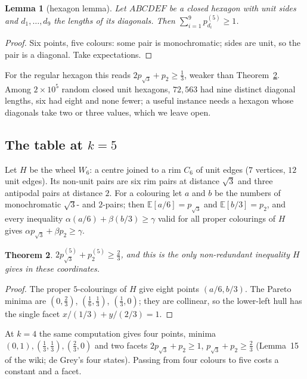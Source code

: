 \documentclass[11pt,a4paper]{amsart}
\newtheorem{theorem}{Theorem}[section]
\newtheorem{lemma}[theorem]{Lemma}
\theoremstyle{remark}
\begin{document}
\begin{lemma}[hexagon lemma]\label{lem:hexagon}
Let $ABCDEF$ be a closed hexagon with unit sides and $d_1,\dots,d_9$ the lengths of its diagonals. Then $\sum_{i=1}^9p^{(5)}_{d_i}\ge1$.
\end{lemma}

\begin{proof}
Six points, five colours: some pair is monochromatic; sides are unit, so the pair is a diagonal. Take expectations.
\end{proof}

For the regular hexagon this reads $2p_{\sqrt3}+p_2\ge\tfrac13$, weaker than Theorem~\ref{thm:wheel}. Among $2\times10^5$ random closed unit hexagons, $72{,}563$ had nine distinct diagonal lengths, six had eight and none fewer; a useful instance needs a hexagon whose diagonals take two or three values, which we leave open.

\subsection{The table at $k=5$}

Let $H$ be the wheel $W_6$: a centre joined to a rim $C_6$ of unit edges ($7$ vertices, $12$ unit edges). Its non-unit pairs are six rim pairs at distance $\sqrt3$ and three antipodal pairs at distance $2$. For a colouring let $a$ and $b$ be the numbers of monochromatic $\sqrt3$- and $2$-pairs; then $\mathbb E[a/6]=p_{\sqrt3}$ and $\mathbb E[b/3]=p_2$, and every inequality $\alpha(a/6)+\beta(b/3)\ge\gamma$ valid for all proper colourings of $H$ gives $\alpha p_{\sqrt3}+\beta p_2\ge\gamma$.

\begin{theorem}\label{thm:wheel}
$2p^{(5)}_{\sqrt3}+p^{(5)}_2\ge\tfrac23$, and this is the only non-redundant inequality $H$ gives in these coordinates.
\end{theorem}

\begin{proof}
The proper $5$-colourings of $H$ give eight points $(a/6,b/3)$. The Pareto minima are $(0,\tfrac23)$, $(\tfrac16,\tfrac13)$, $(\tfrac13,0)$; they are collinear, so the lower-left hull has the single facet $x/(1/3)+y/(2/3)=1$.
\end{proof}

At $k=4$ the same computation gives four points, minima $(0,1),(\tfrac13,\tfrac13),(\tfrac23,0)$ and two facets $2p_{\sqrt3}+p_2\ge1$, $p_{\sqrt3}+p_2\ge\tfrac23$ (Lemma~15 of the wiki; de Grey's four states). Passing from four colours to five costs a constant and a facet.
\end{document}
